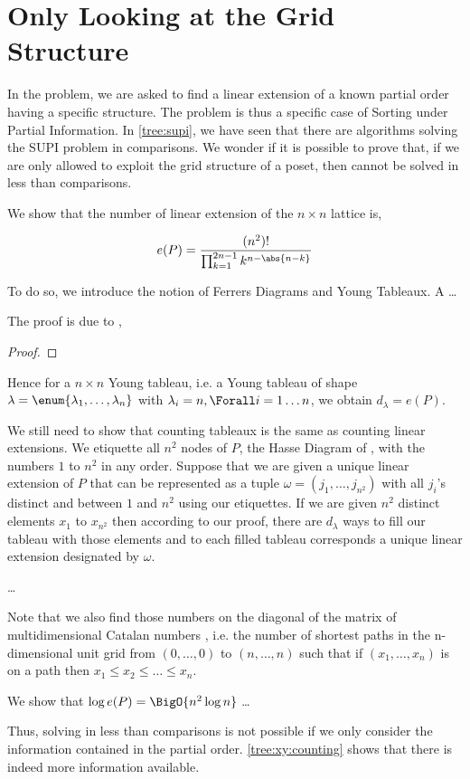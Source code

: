 \section{Only Looking at the Grid Structure}
\label{tree:xy:grid}

In the \XY problem, we are asked to find a linear extension of a known partial
order having a specific structure. The \XY problem is thus a specific case of
Sorting under Partial Information. In \ref{tree:supi}, we have seen that there
are algorithms solving the SUPI problem in  comparisons. We
wonder if it is possible to prove that, if we are only allowed to exploit the
grid structure of a \XY poset, then \XY cannot be solved in less than  comparisons.

We show that the number of linear extension of the $n \times n$ lattice is,

$$ e(P) = \frac{(n^2)!}{\prod_{k=1}^{2n-1} k^{n - \abs{n-k}}} $$

To do so, we introduce the notion of Ferrers Diagrams and Young Tableaux. A
\dots

The proof is due to \citet*{greene:1979},

\begin{proof}

\end{proof}

Hence for a $n \times n$ Young tableau, i.e. a Young tableau of shape $\lambda
= \enum{ \lambda_1 , \ldots , \lambda_n }$ with $\lambda_i = n, \Forall i = 1
\ldots n$, we obtain $d_{\lambda} = e(P)$.

We still need to show that counting tableaux is the same as counting linear
extensions. We etiquette all $n^2$ nodes of $P$, the Hasse Diagram of \XY, with the
numbers $1$ to $n^2$ in any order. Suppose that we are given a unique linear
extension of $P$ that can be represented as a tuple $\omega = ( j_1 , \ldots ,
j_{n^2})$ with all $j_i$'s distinct and between $1$ and $n^2$ using our
etiquettes. If we are given $n^2$ distinct elements $x_1$ to $x_{n^2}$ then
according to our proof, there are $d_{\lambda}$ ways to fill our tableau with
those elements and to each filled tableau corresponds a unique linear
extension designated by $\omega$.

\dots

Note that we also find those numbers on the diagonal of the matrix of
multidimensional Catalan numbers \cite{gorska:2013}, i.e. the number of
shortest paths in the n-dimensional unit grid from $(0,\ldots,0)$ to
$(n,\ldots,n)$ such that if $(x_1,\ldots,x_n)$ is on a path then $x_1 \le x_2
\le \ldots \le x_n$.

We show that $\log e(P) = \BigO{n^2 \log n}$ \dots

Thus, solving \XY in less than  comparisons is not possible
if we only consider the information contained in the partial order.
\ref{tree:xy:counting} shows that there is indeed more information available.

